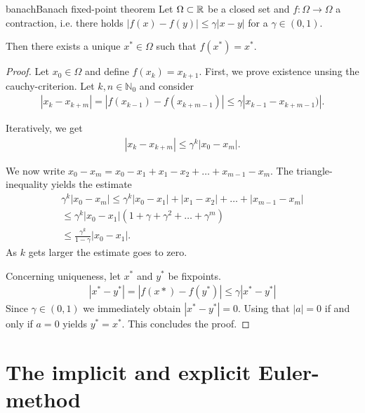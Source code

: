 \begin{Theorem*}{banach}{Banach fixed-point theorem}
	Let $\Omega \subset \mathbb R$ be a closed set and $f \colon \Omega \to \Omega$
	a contraction, i.e. there holds $|f(x) - f(y)| \le \gamma |x-y|$ for a
	$\gamma \in (0,1)$.

	Then there exists a unique $x^* \in \Omega$ such that $f(x^*) =x^*$.
\end{Theorem*}

\begin{proof}
	Let $x_0 \in \Omega$ and define $f(x_k) = x_{k+1}$. First, we prove
	existence unsing the cauchy-criterion. Let $k, n \in \mathbb N_0$ and consider
	\begin{gather*}
	|x_k - x_{k+m} | = |f(x_{k-1}) - f(x_{k+m-1})| \le \gamma |x_{k-1} - x_{k+m-1})|.
	\end{gather*}

	Iteratively, we get
	\begin{gather*}
	|x_k - x_{k+m} | \le \gamma^k |x_0 - x_m|.
	\end{gather*}

	We now write $x_0 - x_m = x_0 - x_1 + x_1 - x_2 + \dots + x_{m-1} - x_m$.
	The triangle-inequality yields the estimate
	\begin{gather*}
	\gamma^k |x_0 - x_m| \le \gamma^k |x_0 - x_1| + |x_1 - x_2| + \dots + |x_{m-1} - x_m|  \\
	\le \gamma^k |x_0 - x_1| (1 + \gamma + \gamma ^2 + \dots + \gamma^m) \\
	\le \frac{\gamma^k}{1-\gamma} |x_0 - x_1|.
	\end{gather*}
	As $k$ gets larger the estimate goes to zero.

	Concerning uniqueness, let $x^*$ and $y^*$ be fixpoints.
	\begin{gather*}
	|x^* - y^*| = |f(x*) - f(y^*) | \le \gamma |x^* - y^*|
	\end{gather*}
	Since $\gamma \in (0,1)$ we immediately obtain $|x^* - y^*| = 0$. Using
	that $|a| = 0$ if and only if $a=0$ yields $y^* = x^*$. This concludes the proof.
\end{proof}

\section{The implicit and explicit Euler-method}

